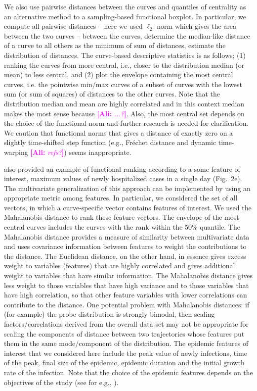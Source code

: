\documentclass[12pt]{article}
\newcommand{\comment}{\showcomment}
\newcommand{\showcomment}[3]{\textcolor{#1}{\textbf{[#2: }\textsl{#3}\textbf{]}}}
\newcommand{\ali}[1]{\comment{magenta}{Ali}{#1}}
\theoremstyle{definition} %
\begin{document}
We also use pairwise distances between the curves and quantiles of centrality as an alternative method to a sampling-based functional boxplot. In particular, we compute all pairwise distances -- here we used $\ell_2$ norm which gives the area between the two curves -- between the curves, determine the median-like distance of a curve to all others as the minimum of sum of distances, estimate the distribution of distances. The curve-based descriptive statistics is as follows;
(1) ranking the curves from more central, i.e., closer to the distribution median (or mean) to less central, and (2) plot the envelope containing the most central curves, i.e. the pointwise min/max curves of a subset of curves with the lowest sum (or sum of squares) of distances to the other curves. Note that the distribution median and mean are highly correlated and in this context median makes the most sense because \ali{...?}. Also, the most central set depends on the choice of the functional norm and further research is needed for clarification. We caution that functional norms that gives a distance of exactly zero on a slightly time-shifted step function (e.g., Fréchet distance and dynamic time-warping \ali{refs?}) seems inappropriate.

\cite{juul2021fixed} also provided an example of functional ranking according to a some feature of interest, maximum values of newly hospitalized cases in a single day (Fig.~2e). The multivariate generalization of this approach can be implemented by using an appropriate metric among features. In particular, we considered the set of all vectors, in which a curve-specific vector contains features of interest. We used the Mahalanobis distance \citep{mahalanobis1936generalized} to rank these feature vectors. 
The envelope of the most central curves includes the curves with the rank within the 50\% quantile. The Mahalanobis distance provides a measure of similarity between multivariate data and uses covariance information between features to weight the contributions to the distance. The Euclidean distance, on the other hand, in essence gives excess weight to variables (features) that are highly correlated and gives additional weight to variables that have similar information. The Mahalanobis distance gives less weight to those variables that have high variance and to those variables that have high correlation, so that other feature variables with lower correlations can contribute to the distance. One potential problem with Mahalanobis distances: if (for example) the probe distribution is strongly bimodal, then scaling factors/correlations derived from the overall data set may not be appropriate for scaling the components of distance between two trajectories whose features
put them in the same mode/component of the distribution.  The epidemic features of interest that we considered here include the peak value of newly infections, time of the peak, final size of the epidemic, epidemic duration and the initial growth rate of the infection. Note that the choice of the epidemic features depends on the objectives of the study (see for e.g., \cite{probert2016decision}).
\end{document}

